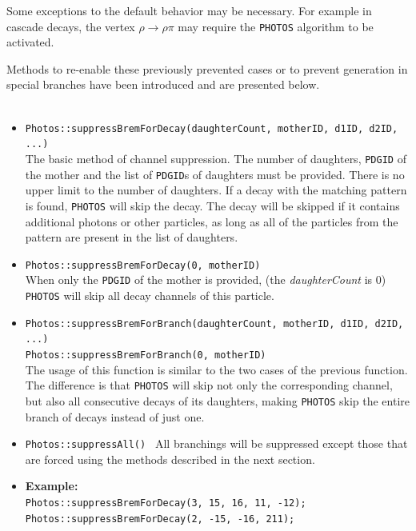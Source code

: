 \documentclass[]{Photos_interface_design}
\begin{document}
Some exceptions to the default behavior may be necessary. For example
in cascade decays, the vertex $\rho \to \rho \pi$ may require the
{\tt PHOTOS} algorithm to be activated.

Methods to re-enable these previously prevented cases or to prevent generation in special
branches have been introduced and are presented below. \\ \\ 


\begin{itemize}
 \item {\tt Photos::suppressBremForDecay(daughterCount, motherID, d1ID, d2ID, ...)} \hfill \\
       The basic method of channel suppression. The number of daughters,
	   {\tt PDGID} of the mother and the list of {\tt PDGID}s of daughters must be provided.
	   There is no upper limit to the number of daughters.
	   If a decay with the matching pattern is found, {\tt PHOTOS} will skip the decay.
           The decay will be skipped if it contains additional photons or other particles,
           as long as all of the particles from the pattern are present in the list of daughters.
 \item {\tt Photos::suppressBremForDecay(0, motherID)} \hfill \\
       When only the {\tt PDGID} of the mother is provided, (the {\it daughterCount} is 0) {\tt PHOTOS} will skip all decay channels
	   of this particle. 
 \item {\tt Photos::suppressBremForBranch(daughterCount, motherID, d1ID, d2ID, ...)} \hfill \\
       {\tt Photos::suppressBremForBranch(0, motherID)} \hfill \\
       The usage of this function is similar to the two cases of the previous function. The difference is
	   that {\tt PHOTOS} will skip not only the corresponding channel,
	   but also all consecutive decays of its daughters, making {\tt PHOTOS} skip the entire branch
	   of decays instead of just one.
 \item {\tt Photos::suppressAll() }
       All branchings will be suppressed except those that are forced using the methods
	   described in the next section.
 \item \textbf{Example:} \hfill \\
{\tt Photos::suppressBremForDecay(3, 15, 16, 11, -12); } \\
{\tt Photos::suppressBremForDecay(2, -15, -16, 211); } \\

\end{itemize}
\end{document}
